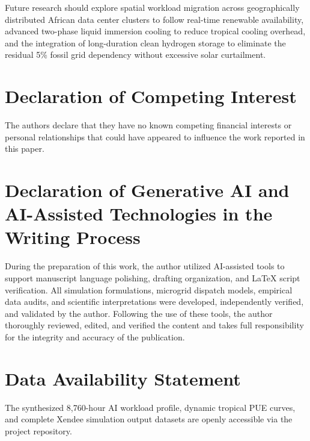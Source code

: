 \documentclass[11pt,a4paper]{article}
\begin{document}
Future research should explore spatial workload migration across geographically distributed African data center clusters to follow real-time renewable availability, advanced two-phase liquid immersion cooling to reduce tropical cooling overhead, and the integration of long-duration clean hydrogen storage to eliminate the residual 5\% fossil grid dependency without excessive solar curtailment.

\section*{Declaration of Competing Interest}
The authors declare that they have no known competing financial interests or personal relationships that could have appeared to influence the work reported in this paper.

\section*{Declaration of Generative AI and AI-Assisted Technologies in the Writing Process}
During the preparation of this work, the author utilized AI-assisted tools to support manuscript language polishing, drafting organization, and LaTeX script verification. All simulation formulations, microgrid dispatch models, empirical data audits, and scientific interpretations were developed, independently verified, and validated by the author. Following the use of these tools, the author thoroughly reviewed, edited, and verified the content and takes full responsibility for the integrity and accuracy of the publication.

\section*{Data Availability Statement}
The synthesized 8,760-hour AI workload profile, dynamic tropical PUE curves, and complete Xendee simulation output datasets are openly accessible via the project repository.



\end{document}
